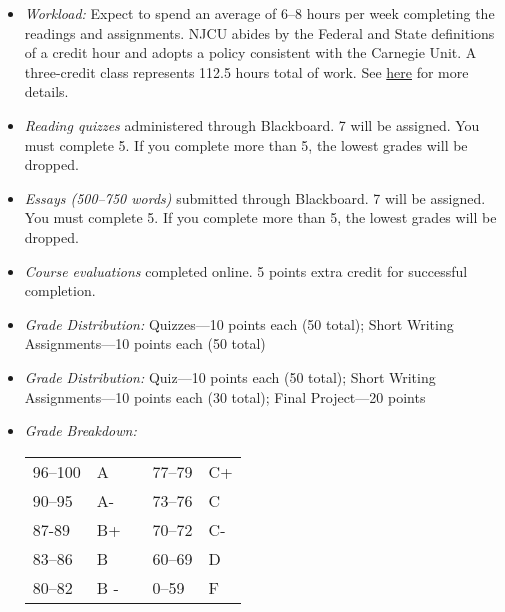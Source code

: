 \documentclass[article,oneside]{memoir}
\begin{document}
\begin{itemize}
\item \textit{Workload:} Expect to spend an average of 6--8 hours per week  completing the readings and assignments. NJCU abides by the Federal and State definitions of a credit hour and adopts a policy consistent with the Carnegie Unit. A three-credit class represents 112.5 hours total of work. See \href{http://scoconno.github.io/Teaching/Credit.pdf}{here} for more details.

\item \textit{Reading quizzes} administered through Blackboard. 7 will be assigned. You must complete 5. If you complete more than 5, the lowest grades will be dropped. 


\item \textit{Essays (500--750 words)} submitted through Blackboard.  7 will be assigned. You must complete 5. If you complete more than 5, the lowest grades will be dropped. 

\item \textit{Course evaluations} completed online. 5 points extra credit for successful completion.
 
\item \textit{Grade Distribution:} Quizzes---10 points each (50 total);  Short Writing Assignments---10 points each (50 total)

 
\item \textit{Grade Distribution:} Quiz---10 points each (50 total);  Short Writing Assignments---10 points each (30 total); Final Project---20 points 


\item \textit{Grade Breakdown:}

 \begin{tabular}{ | l | l | p{2cm} | l | l | }
    \hline 
96--100 & A  & &  77--79 &  C+ \\  
90--95 & A- & &  73--76 & C \\
87-89 & B+ &  &  70--72 & C- \\ 
83--86 & B  & &  60--69 & D\\
80--82 & B - & & 0--59 & F\\ \hline
    \end{tabular}


\end{itemize}
\end{document}
